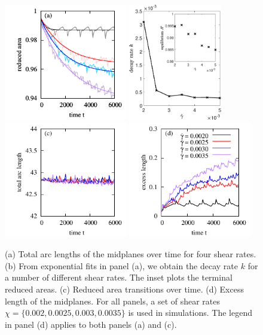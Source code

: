 \documentclass[lineno]{jfm}
\begin{document}
\begin{figure}
\begin{center}
\hspace{-0.6cm}
\includegraphics[height=2in]{ReducedArea.pdf}
\hspace{0.6cm}
\includegraphics[height=2in]{DecayRate.eps}\\
\includegraphics[height=2in]{ArcLength.pdf}
\includegraphics[height=2in]{ExcLength.pdf}
\end{center} 
  \caption{\label{figure4} (a) Total arc lengths of the midplanes over
  time for four shear rates. (b) From exponential fits in panel (a), we
  obtain the decay rate $k$ for a number of different shear rates. The
  inset plots the terminal reduced areas. (c) Reduced area transitions
  over time. (d) Excess length of the midplanes. For all panels, a set
  of shear rates $\chi=\{0.002,0.0025,0.003,0.0035\}$ is used in
  simulations. The legend in panel (d) applies to both panels (a) and
  (c).}
\end{figure}
\end{document}

